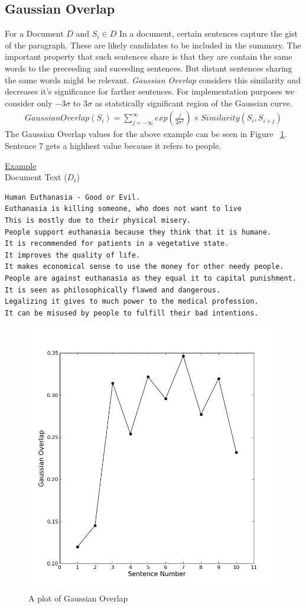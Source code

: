 \documentclass[BTech]{nitgoathesis}
\begin{document}
\subsection{Gaussian Overlap}
For a Document $D$ and $S_i \in D$
In a document, certain sentences capture the gist of the paragraph. These are likely candidates to be included in the summary. The important property that such sentences share is that they are contain the same words to the preceeding and suceeding sentences. But distant sentences sharing the same words might be relevant. \emph{Gaussian Overlap} considers this similarity and decreases it's significance for farther sentences. For implementation purposes we consider only $-3\sigma$ to $3\sigma$ as statstically significant region of the Gaussian curve.
\begin{align}
GaussianOverlap(S_i) =\sum\limits_{j = - \infty}^{\infty} exp \left( \frac{j}{2\sigma^2} \right) \times Similarity(S_i,S_{i+j})
\end{align}
The Gaussian Overlap values for the above example can be seen in Figure ~\ref{fig:go}. Sentence 7 gets a highhest value because it refers to people.
\newpage

{\noindent \large \underline{Example}} \\
{Document Text ($D_t$)}
\begin{lstlisting}
Human Euthanasia - Good or Evil.
Euthanasia is killing someone, who does not want to live
This is mostly due to their physical misery.
People support euthanasia because they think that it is humane.
It is recommended for patients in a vegetative state.
It improves the quality of life.
It makes economical sense to use the money for other needy people.
People are against euthanasia as they equal it to capital punishment.
It is seen as philosophically flawed and dangerous.
Legalizing it gives to much power to the medical profession.
It can be misused by people to fulfill their bad intentions.
\end{lstlisting}

\begin{figure}[h!]
  \centering
    \includegraphics[width=.8\textwidth]{images/go}
    \caption{A plot of Gaussian Overlap }
    \label{fig:go}
\end{figure}
\pagebreak
\end{document}
